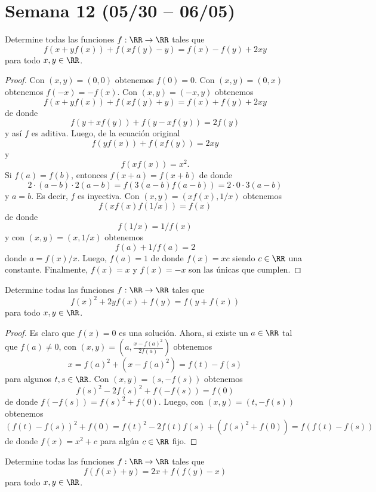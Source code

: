 \section{Semana 12 (05/30 -- 06/05)}


\begin{probMG}
  Determine todas las funciones $f:\RR\to\RR$ tales que
  \[f(x+yf(x))+f(xf(y)-y)=f(x)-f(y)+2xy\]
  para todo $x,y\in\RR$.
\end{probMG}

\begin{proof}
  Con $(x,y)=(0,0)$ obtenemos $f(0)=0$. Con $(x,y)=(0,x)$ obtenemos
  $f(-x)=-f(x)$. Con $(x,y)=(-x,y)$ obtenemos
  \[f(x+yf(x))+f(xf(y)+y)=f(x)+f(y)+2xy\]
  de donde
  \[f(y+xf(y))+f(y-xf(y))=2f(y)\]
  y así $f$ es aditiva. Luego, de la ecuación original
  \[f(yf(x))+f(xf(y))=2xy\]
  y
  \[f(xf(x))=x^2.\]
  Si $f(a)=f(b)$, entonces $f(x+a)=f(x+b)$ de donde
  \[2\cdot(a-b)\cdot 2(a-b)=f(3(a-b)f(a-b))=2\cdot 0\cdot 3(a-b)\]
  y $a=b$. Es decir, $f$ es inyectiva. Con $(x,y)=(xf(x),1/x)$ obtenemos
  \[f(xf(x)f(1/x))=f(x)\]
  de donde
  \[f(1/x)=1/f(x)\]
  y con $(x,y)=(x,1/x)$ obtenemos
  \[f(a)+1/f(a)=2\]
  donde $a=f(x)/x$. Luego, $f(a)=1$ de donde $f(x)=xc$ siendo $c\in\RR$ una
  constante. Finalmente, $f(x)=x$ y $f(x)=-x$ son las únicas que cumplen.
\end{proof}

\begin{probEG}
  Determine todas las funciones $f:\RR\to\RR$ tales que
  \[f(x)^2+2yf(x)+f(y)=f(y+f(x))\]
  para todo $x,y\in\RR$.
\end{probEG}

\begin{proof}
  Es claro que $f(x)=0$ es una solución. Ahora, si existe un $a\in\RR$ tal que
  $f(a)\ne 0$, con $(x,y)=\left(a,\frac{x-f(a)^2}{2f(a)}\right)$ obtenemos
  \[x=f(a)^2+(x-f(a)^2)=f(t)-f(s)\]
  para algunos $t,s\in\RR$. Con $(x,y)=(s,-f(s))$ obtenemos
  \[f(s)^2-2f(s)^2+f(-f(s))=f(0)\]
  de donde $f(-f(s))=f(s)^2+f(0)$. Luego, con $(x,y)=(t,-f(s))$ obtenemos
  \[(f(t)-f(s))^2+f(0)=f(t)^2-2f(t)f(s)+(f(s)^2+f(0))=f(f(t)-f(s))\]
  de donde $f(x)=x^2+c$ para algún $c\in\RR$ fijo.
\end{proof}

\begin{probMB}
  Determine todas las funciones $f:\RR\to\RR$ tales que
  \[f(f(x)+y)=2x+f(f(y)-x)\]
  para todo $x,y\in\RR$.
\end{probMB}

